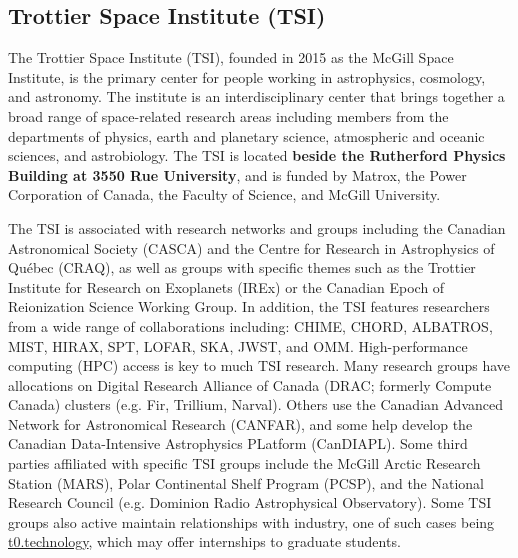 \subsection*{Trottier Space Institute (TSI)}
The Trottier Space Institute (TSI), founded in 2015 as the McGill Space Institute, is the primary center for people working in astrophysics, cosmology, and astronomy. The institute is an interdisciplinary center that brings together a broad range of space-related research areas including members from the departments of physics, earth and planetary science, atmospheric and oceanic sciences, and astrobiology. The TSI is located \textbf{beside the Rutherford Physics Building at 3550 Rue University}, and is funded by Matrox, the Power Corporation of Canada, the Faculty of Science, and McGill University. 

The TSI is associated with research networks and groups including the Canadian Astronomical Society (CASCA) and the Centre for Research in Astrophysics of Québec (CRAQ), as well as groups with specific themes such as the Trottier Institute for Research on Exoplanets (IREx) or the Canadian Epoch of Reionization Science Working Group. In addition, the TSI features researchers from a wide range of collaborations including: CHIME, CHORD, ALBATROS, MIST, HIRAX, SPT, LOFAR, SKA, JWST, and OMM. High-performance computing (HPC) access is key to much TSI research. Many research groups have allocations on Digital Research Alliance of Canada (DRAC; formerly Compute Canada) clusters (e.g. Fir, Trillium, Narval). Others use the Canadian Advanced Network for Astronomical Research (CANFAR), and some help develop the Canadian Data-Intensive Astrophysics PLatform (CanDIAPL). Some third parties affiliated with specific TSI groups include the McGill Arctic Research Station (MARS), Polar Continental Shelf Program (PCSP), and the National Research Council (e.g. Dominion Radio Astrophysical Observatory). Some TSI groups also active maintain relationships with industry, one of such cases being \href{https://www.t0.technology/}{t0.technology}, which may offer internships to graduate students.

